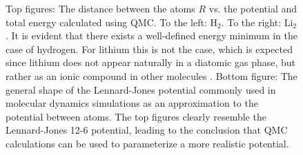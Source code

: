 \begin{figure}
 \begin{center}
  \caption{Top figures: The distance between the atoms $R$ vs. the potential and total energy calculated using QMC. To the left: $\mathrm{H_2}$. To the right: $\mathrm{Li_2}$. It is evident that there exists a well-defined energy minimum in the case of hydrogen. For lithium this is not the case, which is expected since lithium does not appear naturally in a diatomic gas phase, but rather as an ionic compound in other molecules \cite{UniversityPhysics}. Bottom figure: The general shape of the Lennard-Jones potential commonly used in molecular dynamics simulations as an approximation to the potential between atoms. The top figures clearly resemble the Lennard-Jones 12-6 potential, leading to the conclusion that QMC calculations can be used to parameterize a more realistic potential.}

\end{center}
\end{figure}

